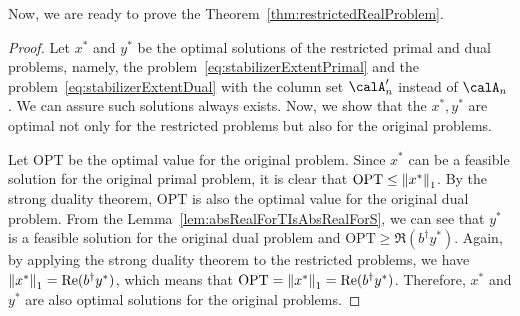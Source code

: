\documentclass[a4paper, onecolumn, 11pt, longbibliography]{quantumarticle}
\begin{document}
Now, we are ready to prove the Theorem~\ref{thm:restrictedRealProblem}.

\restrictedRealProblem*
\begin{proof}
  Let $x^*$ and $y^*$ be the optimal solutions
  of the restricted primal and dual problems,
  namely, the problem~\eqref{eq:stabilizerExtentPrimal}
  and the problem~\eqref{eq:stabilizerExtentDual}
  with the column set $\calA'_n$ instead of $\calA_n$.
  We can assure such solutions always exists.
  Now, we show that the $x^*, y^*$ are
  optimal not only for the restricted problems
  but also for the original problems.

  Let $\mathrm{OPT}$ be the optimal value for the original problem.
  Since $x^*$ can be a feasible solution for the original primal problem,
  it is clear that $\mathrm{OPT} \leq \norm{x^*}_1$.
  By the strong duality theorem,
  $\mathrm{OPT}$ is also the optimal value
  for the original dual problem.
  From the Lemma~\ref{lem:absRealForTIsAbsRealForS},
  we can see that $y^*$ is a feasible solution
  for the original dual problem and $\mathrm{OPT} \geq \Re(b^\dagger y^*)$.
  Again, by applying the strong duality theorem
  to the restricted problems,
  we have $\norm{x^*}_1 = \Re(b^\dagger y^*)$,
  which means that $\mathrm{OPT} = \norm{x^*}_1 = \Re(b^\dagger y^*)$.
  Therefore, $x^*$ and $y^*$ are also optimal solutions
  for the original problems.
\end{proof}
\end{document}
